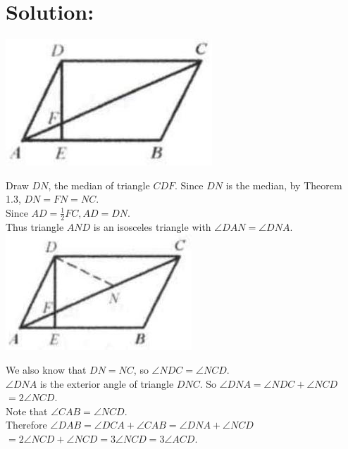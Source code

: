 \documentclass[10pt]{article}
\begin{document}
\section*{Solution:}
\begin{center}
\includegraphics[max width=\textwidth]{2025_04_17_97bc1f7e44d93c271a88g-012(1)}
\end{center}

Draw \(D N\), the median of triangle \(C D F\). Since \(D N\) is the median, by Theorem 1.3, \(D N=F N=N C\).\\
Since \(A D=\frac{1}{2} F C, A D=D N\).\\
Thus triangle \(A N D\) is an isosceles triangle with \(\angle D A N=\angle D N A\).\\
\includegraphics[max width=\textwidth, center]{2025_04_17_97bc1f7e44d93c271a88g-012(2)}

We also know that \(D N=N C\), so \(\angle N D C=\angle N C D\).\\
\(\angle D N A\) is the exterior angle of triangle \(D N C\). So \(\angle D N A=\angle N D C+\angle N C D\)\\
\(=2 \angle N C D\).\\
Note that \(\angle C A B=\angle N C D\).\\
Therefore \(\angle D A B=\angle D C A+\angle C A B=\angle D N A+\angle N C D\)\\
\(=2 \angle N C D+\angle N C D=3 \angle N C D=3 \angle A C D\).
\end{document}
